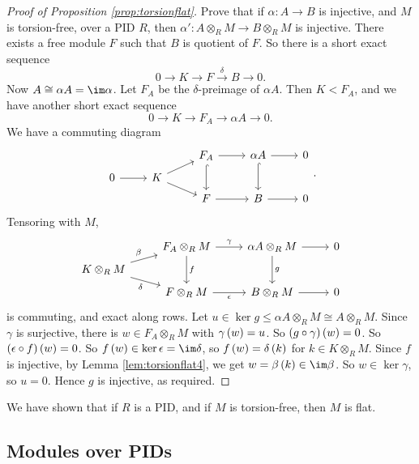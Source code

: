 \pagebreak

\begin{proof}[Proof of Proposition \ref{prop:torsionflat}]
Prove that if $ \alpha : A \to B $ is injective, and $ M $ is torsion-free, over a PID $ R $, then $ \alpha' : A \otimes_R M \to B \otimes_R M $ is injective. There exists a free module $ F $ such that $ B $ is quotient of $ F $. So there is a short exact sequence
$$ 0 \to K \to F \xrightarrow{\delta} B \to 0. $$
Now $ A \cong \alpha A = \im \alpha $. Let $ F_A $ be the $ \delta $-preimage of $ \alpha A $. Then $ K < F_A $, and we have another short exact sequence
$$ 0 \to K \to F_A \to \alpha A \to 0. $$
We have a commuting diagram
$$
\begin{tikzcd}[row sep=tiny]
& & F_A \arrow{r} \arrow[hookrightarrow]{dd} & \alpha A \arrow{r} \arrow[hookrightarrow]{dd} & 0 \\
0 \arrow{r} & K \arrow{ur} \arrow{dr} & & & \\
& & F \arrow{r} & B \arrow{r} & 0
\end{tikzcd}.
$$
Tensoring with $ M $,
$$
\begin{tikzcd}[row sep=tiny]
& F_A \otimes_R M \arrow{r}{\gamma} \arrow{dd}{f} & \alpha A \otimes_R M \arrow{r} \arrow{dd}{g} & 0 \\
K \otimes_R M \arrow{ur}{\beta} \arrow{dr}[swap]{\delta} & & & \\
& F \otimes_R M \arrow{r}[swap]{\epsilon} & B \otimes_R M \arrow{r} & 0
\end{tikzcd}
$$
is commuting, and exact along rows. Let $ u \in \ker g \le \alpha A \otimes_R M \cong A \otimes_R M $. Since $ \gamma $ is surjective, there is $ w \in F_A \otimes_R M $ with $ \gamma\br{w} = u $. So $ \br{g \circ \gamma}\br{w} = 0 $. So $ \br{\epsilon \circ f}\br{w} = 0 $. So $ f\br{w} \in \ker \epsilon = \im \delta $, so $ f\br{w} = \delta\br{k} $ for $ k \in K \otimes_R M $. Since $ f $ is injective, by Lemma \ref{lem:torsionflat4}, we get $ w = \beta\br{k} \in \im \beta $. So $ w \in \ker \gamma $, so $ u = 0 $. Hence $ g $ is injective, as required.
\end{proof}

We have shown that if $ R $ is a PID, and if $ M $ is torsion-free, then $ M $ is flat.

\subsection{Modules over PIDs}


